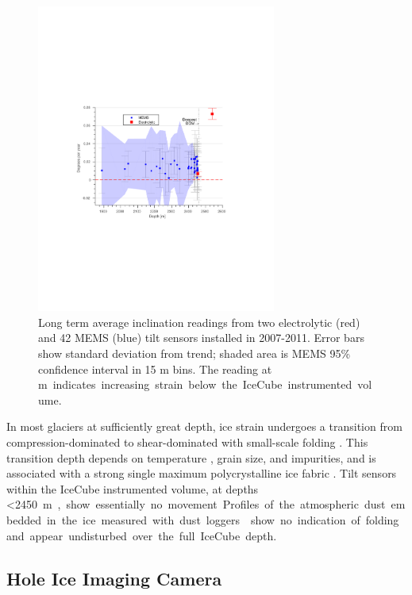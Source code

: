 \begin{figure}[!ht]
	\centering
    \includegraphics[width=0.7\textwidth]{graphics/geometry/tilt5.pdf}
	\caption{Long term average inclination readings from two electrolytic
      (red) and 42 MEMS (blue) tilt sensors installed in 2007-2011.  Error
      bars show standard deviation from trend; shaded area is MEMS 95\%
      confidence interval in 15 m bins.  The reading at \unit[2540]m
      indicates increasing strain below the IceCube instrumented volume.}
	\label{fig:tilt}
\end{figure}

In most glaciers at sufficiently great depth, ice strain undergoes a
transition from compression-dominated to shear-dominated with small-scale
folding \cite{montagnat14,jansen16}.  This transition depth depends on
temperature \cite{price2002temperature}, grain size, and impurities, and is
associated with a strong single maximum polycrystalline ice fabric
\cite{cuffey10}.  Tilt sensors within the IceCube instrumented volume, at
depths \SI{<2450}m, show essentially no movement.  Profiles of the
atmospheric dust embedded in the ice measured with dust loggers \cite{I3:dustlogger} show no
indication of folding and appear undisturbed over the full IceCube depth.

\subsection{Hole Ice Imaging Camera}

